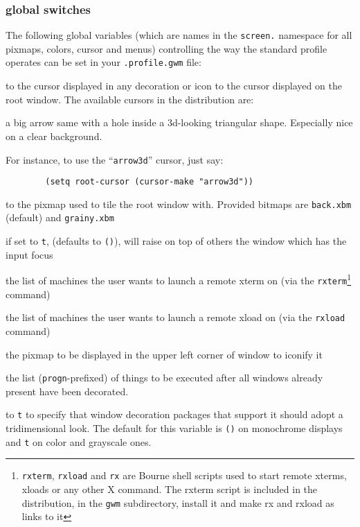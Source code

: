 \subsubsection{global switches}

The following global variables (which are names in the \verb"screen."
namespace for all pixmaps, colors, cursor and menus) controlling the way the
standard profile operates can be set in your \verb".profile.gwm" file:

\begin{description}

 to the cursor displayed in any decoration or icon
 to the cursor displayed on the root window. The
available cursors in the distribution are:
\begin{description} 
 a big arrow
 same with a hole inside
 a 3d-looking triangular shape. Especially nice on a clear
background.
\end{description}
For instance, to use the ``{\tt arrow3d}'' cursor, just say:
{\exemplefont\begin{verbatim}
        (setq root-cursor (cursor-make "arrow3d"))
\end{verbatim}}

 to the pixmap used to tile the root window with.
Provided bitmaps are \verb"back.xbm" (default) and \verb"grainy.xbm"

 if set to \verb"t", (defaults to \verb"()"), {\GWM} will
raise on top of others the window which has the input focus

 the list of machines the user wants to launch a remote
xterm on (via the \verb"rxterm"\footnote{{\tt rxterm}, {\tt rxload}
and {\tt rx} are Bourne shell scripts used to start remote xterms,
xloads or any other X command. The rxterm script is included in the
distribution, in the {\tt gwm} subdirectory, install it and make rx
and rxload as links to it} command)

 the list of machines the user wants to launch a remote
xload on (via the \verb"rxload" command) 

 the pixmap to be displayed in the upper left
corner of window to iconify it 

 the list (\verb"progn"-prefixed) of things
to be executed after all windows already present have been decorated.  

 to \verb"t" to specify that window decoration packages that
support it should adopt a tridimensional look. The default for this variable
is \verb"()" on monochrome displays and \verb"t" on color and grayscale ones.

\end{description}

